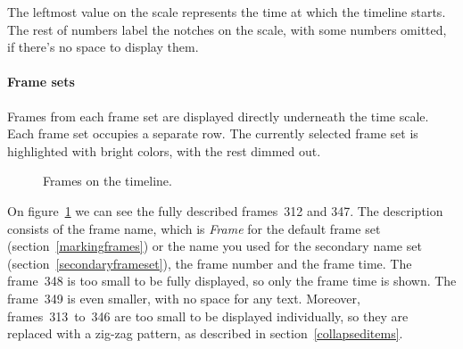 \documentclass[hidelinks,titlepage,a4paper]{article}
\begin{document}
The leftmost value on the scale represents the time at which the timeline starts. The rest of numbers label the notches on the scale, with some numbers omitted, if there's no space to display them.

\paragraph{Frame sets}
\label{framesets}

Frames from each frame set are displayed directly underneath the time scale. Each frame set occupies a separate row. The currently selected frame set is highlighted with bright colors, with the rest dimmed out.

\begin{figure}[h]
\centering{}
\caption{Frames on the timeline.}
\label{framesetsfig}
\end{figure}

On figure~\ref{framesetsfig} we can see the fully described frames~312 and 347. The description consists of the frame name, which is \emph{Frame} for the default frame set (section~\ref{markingframes}) or the name you used for the secondary name set (section~\ref{secondaryframeset}), the frame number and the frame time. The frame~348 is too small to be fully displayed, so only the frame time is shown. The frame~349 is even smaller, with no space for any text. Moreover, frames~313~to~346 are too small to be displayed individually, so they are replaced with a zig-zag pattern, as described in section~\ref{collapseditems}.
\end{document}
